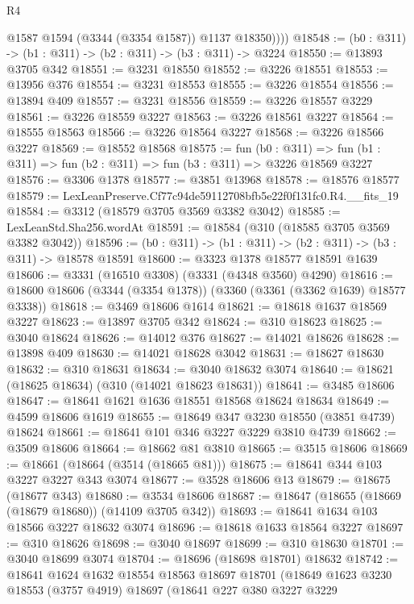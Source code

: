 \begin{lexlean}{R4}
\begin{coremodule}
            @1587
            @1594
            (@3344 (@3354 @1587))
            @1137
            @18350))))
@18548 := (b0 : @311) -> (b1 : @311) -> (b2 : @311) -> (b3 : @311) -> @3224
@18550 := @13893 @3705 @342
@18551 := @3231 @18550
@18552 := @3226 @18551
@18553 := @13956 @376
@18554 := @3231 @18553
@18555 := @3226 @18554
@18556 := @13894 @409
@18557 := @3231 @18556
@18559 := @3226 @18557 @3229
@18561 := @3226 @18559 @3227
@18563 := @3226 @18561 @3227
@18564 := @18555 @18563
@18566 := @3226 @18564 @3227
@18568 := @3226 @18566 @3227
@18569 := @18552 @18568
@18575 := fun (b0 : @311) =>
  fun (b1 : @311) => fun (b2 : @311) => fun (b3 : @311) => @3226 @18569 @3227
@18576 := @3306 @1378
@18577 := @3851 @13968
@18578 := @18576 @18577
@18579 := LexLeanPreserve.Cf77c94de59112708bfb5e22f0f131fc0.R4.__fits_19
@18584 := @3312 (@18579 @3705 @3569 @3382 @3042)
@18585 := LexLeanStd.Sha256.wordAt
@18591 := @18584 (@310 (@18585 @3705 @3569 @3382 @3042))
@18596 := (b0 : @311) -> (b1 : @311) -> (b2 : @311) -> (b3 : @311) -> @18578 @18591
@18600 := @3323 @1378 @18577 @18591 @1639
@18606 := @3331 (@16510 @3308) (@3331 (@4348 @3560) @4290)
@18616 := @18600 @18606 (@3344 (@3354 @1378)) (@3360 (@3361 (@3362 @1639) @18577 @3338))
@18618 := @3469 @18606 @1614
@18621 := @18618 @1637 @18569 @3227
@18623 := @13897 @3705 @342
@18624 := @310 @18623
@18625 := @3040 @18624
@18626 := @14012 @376
@18627 := @14021 @18626
@18628 := @13898 @409
@18630 := @14021 @18628 @3042
@18631 := @18627 @18630
@18632 := @310 @18631
@18634 := @3040 @18632 @3074
@18640 := @18621 (@18625 @18634) (@310 (@14021 @18623 @18631))
@18641 := @3485 @18606
@18647 := @18641 @1621 @1636 @18551 @18568 @18624 @18634
@18649 := @4599 @18606 @1619
@18655 := @18649 @347 @3230 @18550 (@3851 @4739) @18624
@18661 := @18641 @101 @346 @3227 @3229 @3810 @4739
@18662 := @3509 @18606
@18664 := @18662 @81 @3810
@18665 := @3515 @18606
@18669 := @18661 (@18664 (@3514 (@18665 @81)))
@18675 := @18641 @344 @103 @3227 @3227 @343 @3074
@18677 := @3528 @18606 @13
@18679 := @18675 (@18677 @343)
@18680 := @3534 @18606
@18687 := @18647 (@18655 (@18669 (@18679 @18680)) (@14109 @3705 @342))
@18693 := @18641 @1634 @103 @18566 @3227 @18632 @3074
@18696 := @18618 @1633 @18564 @3227
@18697 := @310 @18626
@18698 := @3040 @18697
@18699 := @310 @18630
@18701 := @3040 @18699 @3074
@18704 := @18696 (@18698 @18701) @18632
@18742 := @18641
    @1624
    @1632
    @18554
    @18563
    @18697
    @18701
    (@18649
      @1623
      @3230
      @18553
      (@3757 @4919)
      @18697
      (@18641
        @227
        @380
        @3227
        @3229

\end{coremodule}
\end{lexlean}
